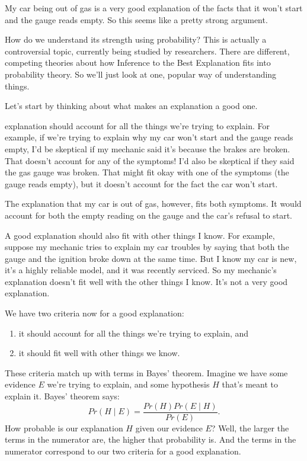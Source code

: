 \documentclass[justified]{tufte-book}
\providecommand{\tightlist}{%
  \setlength{\itemsep}{0pt}\setlength{\parskip}{0pt}}
\newcommand{\given}{\mid}
\newcommand{\p}{Pr}
\theoremstyle{definition}
\theoremstyle{definition}
\theoremstyle{definition}
\theoremstyle{definition}
\theoremstyle{remark}
\begin{document}
My car being out of gas is a very good explanation of the facts that it won't start and the gauge reads empty. So this seems like a pretty strong argument.

How do we understand its strength using probability? This is actually a controversial topic, currently being studied by researchers. There are different, competing theories about how Inference to the Best Explanation fits into probability theory. So we'll just look at one, popular way of understanding things.

Let's start by thinking about what makes an explanation a good one.

 explanation should account for all the things we're trying to explain. For example, if we're trying to explain why my car won't start and the gauge reads empty, I'd be skeptical if my mechanic said it's because the brakes are broken. That doesn't account for any of the symptoms! I'd also be skeptical if they said the gas gauge was broken. That might fit okay with one of the symptoms (the gauge reads empty), but it doesn't account for the fact the car won't start.

The explanation that my car is out of gas, however, fits both symptoms. It would account for both the empty reading on the gauge and the car's refusal to start.

A good explanation should also fit with other things I know. For example, suppose my mechanic tries to explain my car troubles by saying that both the gauge and the ignition broke down at the same time. But I know my car is new, it's a highly reliable model, and it was recently serviced. So my mechanic's explanation doesn't fit well with the other things I know. It's not a very good explanation.

We have two criteria now for a good explanation:

\begin{enumerate}
\def\labelenumi{\arabic{enumi}.}
\tightlist
\item
  it should account for all the things we're trying to explain, and
\item
  it should fit well with other things we know.
\end{enumerate}

These criteria match up with terms in Bayes' theorem. Imagine we have some evidence \(E\) we're trying to explain, and some hypothesis \(H\) that's meant to explain it. Bayes' theorem says:
\[ \p(H \given E) = \frac{\p(H)\p(E \given H)}{\p(E)}. \]
How probable is our explanation \(H\) given our evidence \(E\)? Well, the larger the terms in the numerator are, the higher that probability is. And the terms in the numerator correspond to our two criteria for a good explanation.
\end{document}
